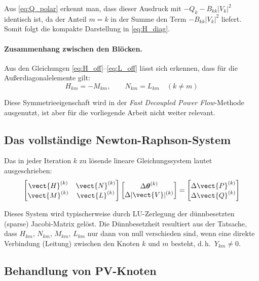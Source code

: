 Aus \eqref{eq:Q_polar} erkennt man, dass dieser Ausdruck mit $-Q_k - B_{kk}|V_k|^2$ identisch ist, da der Anteil $m = k$ in der Summe den Term $-B_{kk}|V_k|^2$ liefert. Somit folgt die kompakte Darstellung in \eqref{eq:H_diag}.

\paragraph{Zusammenhang zwischen den Blöcken.} Aus den Gleichungen \eqref{eq:H_off}--\eqref{eq:L_off} lässt sich erkennen, dass für die Außerdiagonalelemente gilt:
\begin{equation}
	H_{km} = -M_{km}, \qquad N_{km} = L_{km} \quad (k \neq m)
	\label{eq:zusammenhang_bloecke}
\end{equation}

Diese Symmetrieeigenschaft wird in der \textit{Fast Decoupled Power Flow}-Methode ausgenutzt, ist aber für die vorliegende Arbeit nicht weiter relevant.

\subsection{Das vollständige Newton-Raphson-System}
\label{subsec:nr_system}

Das in jeder Iteration $k$ zu lösende lineare Gleichungssystem lautet ausgeschrieben:
\begin{equation}
	\begin{bmatrix}
		\vect{H}^{(k)} & \vect{N}^{(k)} \\
		\vect{M}^{(k)} & \vect{L}^{(k)}
	\end{bmatrix}
	\begin{bmatrix}
		\Delta \boldsymbol{\theta}^{(k)} \\
		\Delta |\vect{V}|^{(k)}
	\end{bmatrix}
	=
	\begin{bmatrix}
		\Delta \vect{P}^{(k)} \\
		\Delta \vect{Q}^{(k)}
	\end{bmatrix}
	\label{eq:nr_system_voll}
\end{equation}

Dieses System wird typischerweise durch LU-Zerlegung der dünnbesetzten (sparse) Jacobi-Matrix gelöst. Die Dünnbesetzheit resultiert aus der Tatsache, dass $H_{km}$, $N_{km}$, $M_{km}$, $L_{km}$ nur dann von null verschieden sind, wenn eine direkte Verbindung (Leitung) zwischen den Knoten $k$ und $m$ besteht, d.\,h.\ $Y_{km} \neq 0$.

\subsection{Behandlung von PV-Knoten}
\label{subsec:nr_pv}

